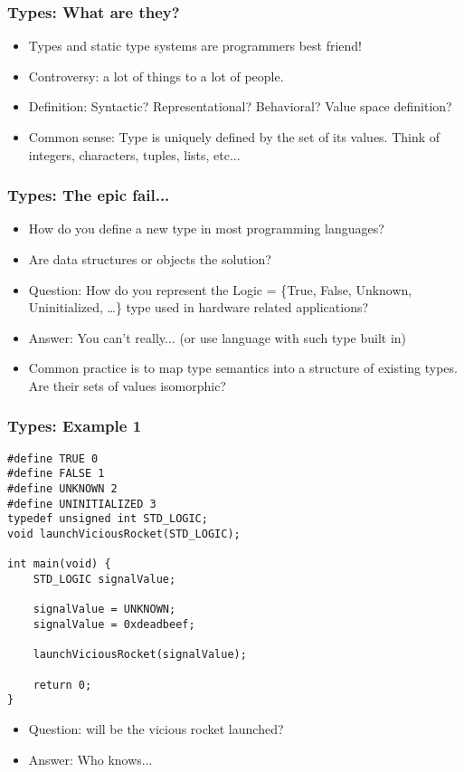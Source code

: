 \documentclass[11pt]{beamer}
\begin{document}
	\begin{frame}
		\frametitle{Types: What are they?}
		\begin{itemize}[<+->]
			\item Types and static type systems are programmers best friend!
			\item Controversy: a lot of things to a lot of people. 
			\item Definition: Syntactic? Representational? Behavioral? Value space definition?
			\item Common sense: Type is uniquely defined by the set of its values. Think of integers, characters, tuples, lists, etc...
		\end{itemize}
	\end{frame}

	\begin{frame}
		\frametitle{Types: The epic fail...}
			\begin{itemize}[<+->]
				\item How do you define a new type in most programming languages?
				\item Are data structures or objects the solution?
				\item Question: How do you represent the Logic = \{True, False, Unknown, Uninitialized, \ldots \} type used in hardware related applications?
				\item Answer: You can't really... (or use language with such type built in)
				\item Common practice is to map type semantics into a structure of existing types. Are their sets of values isomorphic?
			\end{itemize}
	\end{frame}

\begin{frame}[fragile]
\frametitle{Types: Example 1}
\begin{lstlisting}
#define TRUE 0
#define FALSE 1
#define UNKNOWN 2
#define UNINITIALIZED 3
typedef unsigned int STD_LOGIC;
void launchViciousRocket(STD_LOGIC);

int main(void) {
	STD_LOGIC signalValue;

	signalValue = UNKNOWN;
	signalValue = 0xdeadbeef;

	launchViciousRocket(signalValue);
	
	return 0;
}
\end{lstlisting}

\begin{itemize}[<+->]
	\item Question: will be the vicious rocket launched?
	\item Answer: Who knows...
\end{itemize}
\end{frame}
\end{document}
